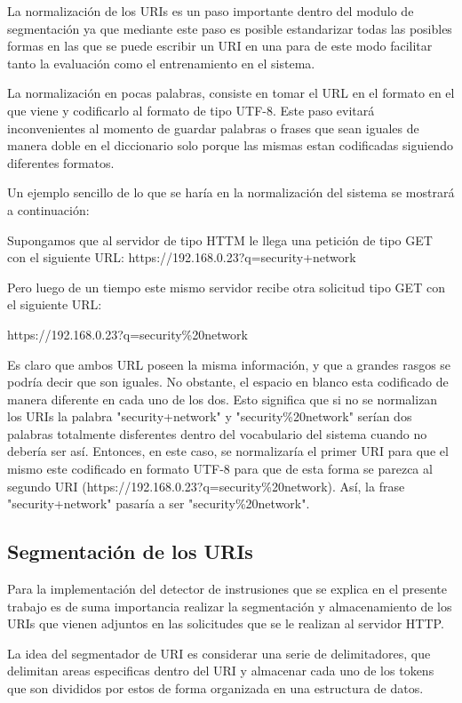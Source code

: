 La normalización de los URIs es un paso importante dentro del modulo de segmentación ya que mediante este paso es posible estandarizar todas las posibles formas en las que se puede escribir un URI en una para de este modo facilitar tanto la evaluación como el entrenamiento en el sistema.

La normalización en pocas palabras, consiste en tomar el URL en el formato en el que viene y codificarlo al formato de tipo UTF-8. Este paso evitará inconvenientes al momento de guardar palabras o frases que sean iguales de manera doble en el diccionario solo porque las mismas estan codificadas siguiendo diferentes formatos.

Un ejemplo sencillo de lo que se haría en la normalización del sistema se mostrará a continuación:

Supongamos que al servidor de tipo HTTM le llega una petición de tipo GET con el siguiente URL:
https://192.168.0.23?q=security+network

Pero luego de un tiempo este mismo servidor recibe otra solicitud tipo GET con el siguiente URL:

https://192.168.0.23?q=security\%20network

Es claro que ambos URL poseen la misma información, y que a grandes rasgos se podría decir que son iguales. No obstante, el espacio en blanco esta codificado de manera diferente en cada uno de los dos. Esto significa que si no se normalizan los URIs la palabra "security+network" y "security\%20network" serían dos palabras totalmente disferentes dentro del vocabulario del sistema cuando no debería ser así. Entonces, en este caso, se normalizaría el primer URI para que el mismo este codificado en formato UTF-8 para que de esta forma se parezca al segundo URI (https://192.168.0.23?q=security\%20network). Así, la frase "security+network" pasaría a ser  "security\%20network".


\subsection{Segmentación de los URIs}
\label{sec:delimitadores}

Para la implementación del detector de instrusiones que se explica en el presente trabajo es de suma importancia realizar la segmentación y almacenamiento de los URIs que vienen adjuntos en las solicitudes que se le realizan al servidor HTTP. 

La idea del segmentador de URI es considerar una serie de delimitadores, que delimitan areas especificas dentro del URI y almacenar cada uno de los tokens que son divididos por estos de forma organizada en una estructura de datos.

